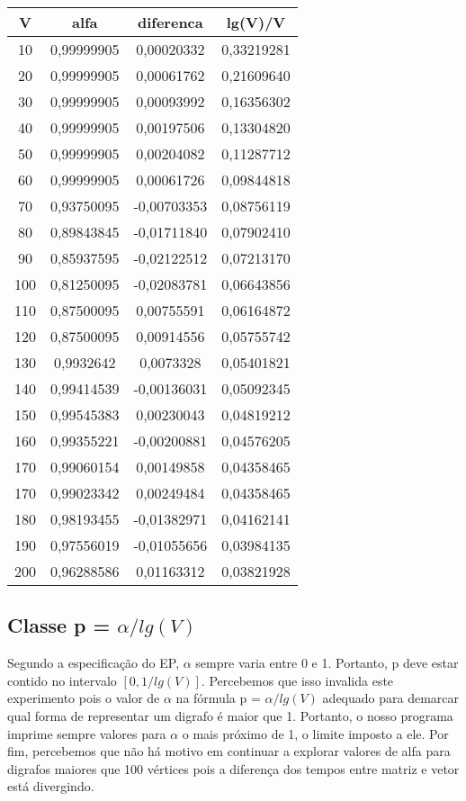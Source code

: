 \documentclass[brazil,times]{abnt}
\begin{document}
\begin{tabular}{|c|c|c|c|}
\hline
V    &  alfa  &  diferenca  &  lg(V)/V\\ \hline
10   &  0,99999905  &  0,00020332  &  0,33219281\\ \hline
20   &  0,99999905  &  0,00061762  &  0,21609640\\ \hline
30   &  0,99999905  &  0,00093992  &  0,16356302\\ \hline
40   &  0,99999905  &  0,00197506  &  0,13304820\\ \hline
50   &  0,99999905  &  0,00204082  &  0,11287712\\ \hline
60   &  0,99999905  &  0,00061726  &  0,09844818\\ \hline
70   &  0,93750095  &  -0,00703353  &  0,08756119\\ \hline
80   &  0,89843845  &  -0,01711840  &  0,07902410\\ \hline
90   &  0,85937595  &  -0,02122512  &  0,07213170\\ \hline
100  &  0,81250095  &  -0,02083781  &  0,06643856\\ \hline
110  &  0,87500095  &  0,00755591  &  0,06164872\\ \hline
120  &  0,87500095  &  0,00914556  &  0,05755742\\ \hline
130  &  0,9932642  &  0,0073328  &  0,05401821\\ \hline
140  &  0,99414539  &  -0,00136031  &  0,05092345\\ \hline
150  &  0,99545383  &  0,00230043  &  0,04819212\\ \hline
160  &  0,99355221  &  -0,00200881  &  0,04576205\\ \hline
170  &  0,99060154  &  0,00149858  &  0,04358465\\ \hline
170  &  0,99023342  &  0,00249484  &  0,04358465\\ \hline
180  &  0,98193455  &  -0,01382971  &  0,04162141\\ \hline
190  &  0,97556019  &  -0,01055656  &  0,03984135\\ \hline
200  &  0,96288586  &  0,01163312   &  0,03821928\\ \hline
\end{tabular}

\subsection*{Classe p = $\alpha/lg(V)$}
Segundo a especificação do EP, $\alpha$ sempre varia entre 0 e 1. Portanto, p deve estar contido no intervalo $[0, 1/lg(V)]$. Percebemos que isso invalida este experimento pois o valor de $\alpha$ na fórmula p = $\alpha/lg(V)$ adequado para demarcar qual forma de representar um digrafo é maior que 1. Portanto, o nosso programa imprime sempre valores para $\alpha$ o mais próximo de 1, o limite imposto a ele. Por fim, percebemos que não há motivo em continuar a explorar valores de alfa para digrafos maiores que 100 vértices pois a diferença dos tempos entre matriz e vetor está divergindo.
\end{document}
